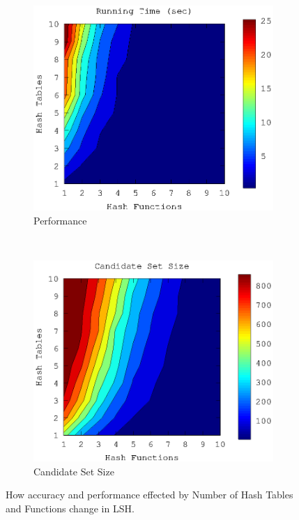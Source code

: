 \documentclass[conference]{IEEEtran}
\begin{document}
\begin{figure}
\begin{subfigure}[b]{0.225\textwidth}
                \includegraphics[width=\textwidth]{charts/runtime-lsh-heat-map.eps}
                \caption{Performance}
                \label{fig:lsh-2d-runtime}
        \end{subfigure} 
        \\
         \begin{subfigure}[b]{0.225\textwidth}
                \includegraphics[width=\textwidth]{charts/candidate-set-lsh-heat-map.eps}
                \caption{Candidate Set Size}
                \label{fig:lsh-2d-candidate-size}
        \end{subfigure} 
        \caption{How accuracy and performance effected by Number of Hash Tables and Functions change in LSH.}
        \label{fig:lsh-2d}
\end{figure}
\end{document}
